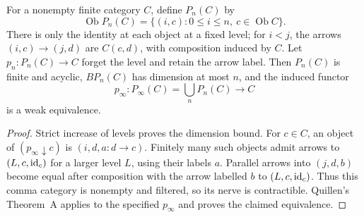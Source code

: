 \begin{lemma}
\label{CD:spread}
For a nonempty finite category $C$, define $P_n(C)$ by
\[
 \operatorname{Ob}P_n(C)=\{(i,c):0\le i\le n,\ c\in\operatorname{Ob}C\}.
\]
There is only the identity at each object at a fixed level; for $i<j$,
the arrows $(i,c)\to(j,d)$ are $C(c,d)$, with composition induced by
$C$.  Let $p_n:P_n(C)\to C$ forget the level and retain the arrow label.
Then $P_n(C)$ is finite and acyclic, $BP_n(C)$ has dimension at most $n$,
and the induced functor
\[
          p_\infty:P_\infty(C)=\bigcup_nP_n(C)\longrightarrow C
\]
is a weak equivalence.
\end{lemma}
\begin{proof}
Strict increase of levels proves the dimension bound.
For $c\in C$, an object of $(p_\infty\downarrow c)$ is
$(i,d,a:d\to c)$.  Finitely many such objects admit arrows to
$(L,c,\mathrm{id}_c)$ for a larger level $L$, using their labels $a$.
Parallel arrows into $(j,d,b)$ become equal after composition with
the arrow labelled $b$ to $(L,c,\mathrm{id}_c)$.
Thus this comma category is nonempty and filtered, so its nerve is
contractible.  Quillen's Theorem~A applies to the specified
$p_\infty$ and proves the claimed equivalence.
\end{proof}

